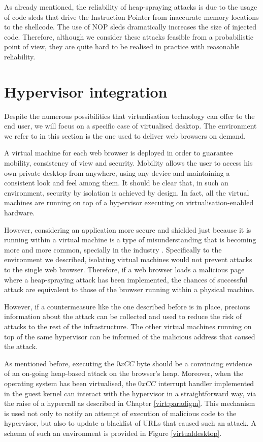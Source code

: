As already mentioned, the reliability of heap-spraying attacks is due to the usage of code sleds that drive the Instruction Pointer from inaccurate memory locations to the shellcode. The use of NOP sleds dramatically increases the size of injected code. Therefore, although we consider these attacks feasible from a probabilistic point of view, they are quite hard to be realised in practice with reasonable reliability.

\newpage


\section{Hypervisor integration}\label{bub:integration}
Despite the numerous possibilities that virtualisation technology can offer to the end user, we will focus on a specific case of virtualised desktop. The environment we refer to in this section is the one used to deliver web browsers on demand. 

A virtual machine for each web browser is deployed in order to guarantee mobility, consistency of view and security. Mobility allows the user to access his own private desktop from anywhere, using any device and maintaining a consistent look and feel among them. It should be clear that, in such an environment, security by isolation is achieved by design. In fact, all the virtual machines are running on top of a hypervisor executing on virtualisation-enabled hardware.

However, considering an application more secure and shielded just because it is running within a virtual machine is a type of misunderstanding that is becoming more and more common, specially in the industry \cite{virtoverkill}. Specifically to the environment we described, isolating virtual machines would not prevent attacks to the single web browser. Therefore, if a web browser loads a malicious page where a heap-spraying attack has been implemented, the chances of successful attack are equivalent to those of the browser running within a physical machine. 

However, if a countermeasure like the one described before is in place, precious information about the attack can be collected and used to reduce the risk of attacks to the rest of the infrastructure. The other virtual machines running on top of the same hypervisor can be informed of the malicious address that caused the attack. 

As mentioned before, executing the $0xCC$ byte should be a convincing evidence of an on-going heap-based attack on the browser's heap. Moreover, when the operating system has been virtualised, the $0xCC$ interrupt handler implemented in the guest kernel can interact with the hypervisor in a straightforward way, via the raise of a hypercall as described in Chapter \ref{virt:paradigm}. This mechanism is used not only to notify  an attempt of execution of malicious code to the hypervisor, but also to update a blacklist of URLs that caused such an attack.
A schema of such an environment is provided in Figure \ref{virtualdesktop}.

